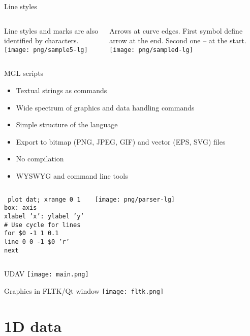 \documentclass[color=usenames]{beamer}
\begin{document}
\begin{frame}{Line styles}
\begin{columns}
Line styles and marks are also identified by characters.\\
\texttt{[image: png/sample5-lg]}

Arrows at curve edges. First symbol define arrow at the end. Second one -- at the start.\\
\texttt{[image: png/sampled-lg]}
\end{columns}
\end{frame}

\begin{frame}{MGL scripts}
\begin{itemize}
\item Textual strings as commands
\item Wide spectrum of graphics and data handling commands
\item Simple structure of the language
\item Export to bitmap (PNG, JPEG, GIF) and vector (EPS, SVG) files
\item No compilation
\item WYSWYG and command line tools
\end{itemize}

\begin{columns}\small
{}
\texttt{\flushleft
plot dat; xrange 0 1\\
box: axis\\
xlabel 'x': ylabel 'y'\\
\# Use cycle for lines\\
for \$0 -1 1 0.1\\
line 0 0 -1 \$0 'r'\\
next}

\texttt{[image: png/parser-lg]}
\end{columns}
\end{frame}

\begin{frame}{UDAV}
\texttt{[image: main.png]}
\end{frame}

\begin{frame}{Graphics in FLTK/Qt window}
\texttt{[image: fltk.png]}
\end{frame}


\section{1D data}
\end{document}
